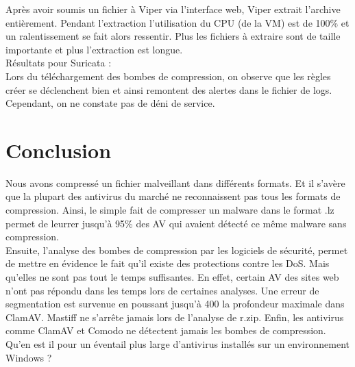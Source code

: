 \documentclass{svjour3}
\begin{document}
$ $\\
Après avoir soumis un fichier à Viper via l'interface web, Viper extrait l'archive entièrement. Pendant l'extraction l'utilisation du CPU (de la VM) est de 100\% et un ralentissement se fait alors ressentir. Plus les fichiers à extraire sont de taille importante et plus l'extraction est longue.\\
$ $\\
Résultats pour Suricata :\\
Lors du téléchargement des bombes de compression, on observe que les règles créer se déclenchent bien et ainsi remontent des alertes dans le fichier de logs. Cependant, on ne constate pas de déni de service.

\section{Conclusion}
\label{2.3conclusion}
Nous avons compressé un fichier malveillant dans différents formats. Et il s’avère que la plupart des antivirus du marché ne reconnaissent pas tous les formats de compression. Ainsi, le simple fait de compresser un malware dans le format .lz permet de leurrer jusqu’à 95\% des AV qui avaient détecté ce même malware sans compression.\\
Ensuite, l'analyse des bombes de compression par les logiciels de sécurité, permet de mettre en évidence le fait qu'il existe des protections contre les DoS. Mais qu'elles ne sont pas tout le temps suffisantes. En effet, certain AV des sites web n'ont pas répondu dans les temps lors de certaines analyses. Une erreur de segmentation est survenue en poussant jusqu'à 400 la profondeur maximale dans ClamAV. Mastiff ne s’arrête jamais lors de l'analyse de r.zip. Enfin, les antivirus comme ClamAV et Comodo ne détectent jamais les bombes de compression.\\
Qu'en est il pour un éventail plus large d'antivirus installés sur un environnement Windows ?
\end{document}
